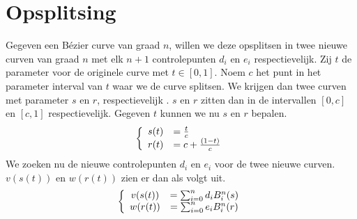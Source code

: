 \documentclass[computergesteund_ontwerp_van_curven_en_oppervlakken.tex]{subfiles}
\begin{document}
\section{Opsplitsing}
Gegeven een B\'ezier curve van graad $n$, willen we deze opsplitsen in twee nieuwe curven van graad $n$ met elk $n+1$ controlepunten $d_i$ en $e_i$ respectievelijk. Zij $t$ de parameter voor de originele curve met $t \in [0,1]$. Noem $c$ het punt in het parameter interval van $t$ waar we de curve splitsen. We krijgen dan twee curven met parameter $s$ en $r$, respectievelijk . $s$ en $r$ zitten dan in de intervallen $[0,c]$ en $[c,1]$ respectievelijk.
Gegeven $t$ kunnen we nu $s$ en $r$ bepalen.
\[
\left\{
\begin{array}{c l}
s(t) &= \frac{t}{c}\\
r(t) &= c + \frac{(1-t)}{c}\\
\end{array}
\right.
\]
We zoeken nu de nieuwe controlepunten $d_i$ en $e_i$ voor de twee nieuwe curven. $v(s(t))$ en $w(r(t))$ zien er dan als volgt uit.
\[
\left\{
\begin{array}{c c}
v(s(t)) &= \sum_{i=0}^{n}d_iB^{n}_{i}(s)\\
w(r(t)) &= \sum_{i=0}^{n}e_iB^{n}_{i}(r)
\end{array}
\right.
\]
\end{document}
